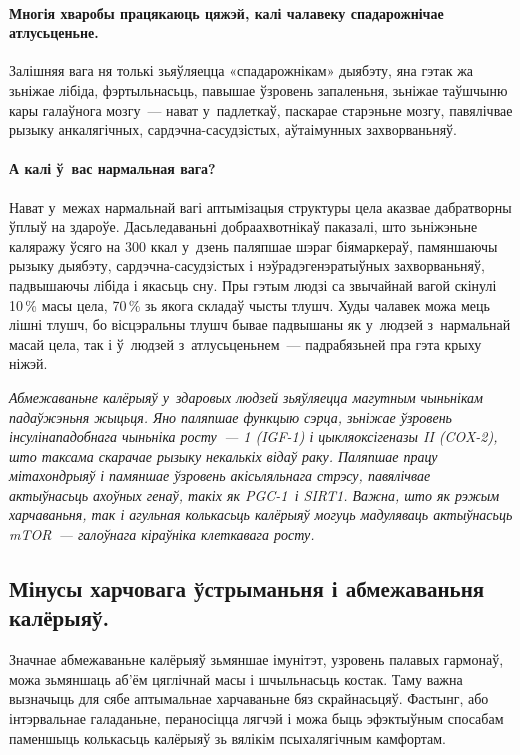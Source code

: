 \paragraph{Многія хваробы працякаюць цяжэй, калі чалавеку спадарожнічае атлусьценьне.} Залішняя вага ня толькі зьяўляецца «спадарожнікам» дыябэту, яна гэтак жа зьніжае лібіда, фэртыльнасьць, павышае ўзровень запаленьня, зьніжае таўшчыню кары галаўнога мозгу~--- нават у~падлеткаў, паскарае старэньне мозгу, павялічвае рызыку анкалягічных, сардэчна-сасудзістых, аўтаімунных захворваньняў.

\paragraph{А калі ў~вас нармальная вага?} Нават у~межах нармальнай вагі аптымізацыя структуры цела аказвае дабратворны ўплыў на здароўе. Дасьледаваньні добраахвотнікаў паказалі, што зьніжэньне каляражу ўсяго на 300 ккал у~дзень паляпшае шэраг біямаркераў, памяншаючы рызыку дыябэту, сардэчна-сасудзістых і нэўрадэгенэратыўных захворваньняў, падвышаючы лібіда і якасьць сну. Пры гэтым людзі са звычайнай вагой скінулі 10\,\% масы цела, 70\,\% зь якога складаў чысты тлушч. Худы чалавек можа мець лішні тлушч, бо вісцэральны тлушч бывае падвышаны як у~людзей з~нармальнай масай цела, так і ў~людзей з~атлусьценьнем~--- падрабязьней пра гэта крыху ніжэй.

\emph{Абмежаваньне калёрыяў у~здаровых людзей зьяўляецца магутным чыньнікам падаўжэньня жыцьця. Яно паляпшае функцыю сэрца, зьніжае ўзровень інсулінападобнага чыньніка росту~--- 1 (IGF-1) і цыкляоксігеназы II (COX-2), што таксама скарачае рызыку некалькіх відаў раку. Паляпшае працу мітахондрыяў і памяншае ўзровень акісьляльнага стрэсу, павялічвае актыўнасьць ахоўных генаў, такіх як PGC-1\alpha\ і SIRT1. Важна, што як рэжым харчаваньня, так і агульная колькасьць калёрыяў могуць мадуляваць актыўнасьць mTOR~--- галоўнага кіраўніка клеткавага росту.}

\subsection*{Мінусы харчовага ўстрыманьня і абмежаваньня калёрыяў.}

Значнае абмежаваньне калёрыяў зьмяншае імунітэт, узровень палавых гармонаў, можа зьмяншаць аб'ём цяглічнай масы і шчыльнасьць костак. Таму важна вызначыць для сябе аптымальнае харчаваньне бяз скрайнасьцяў. Фастынг, або інтэрвальнае галаданьне, пераносіцца лягчэй і можа быць эфэктыўным спосабам паменшыць колькасьць калёрыяў зь вялікім псыхалягічным камфортам. 

